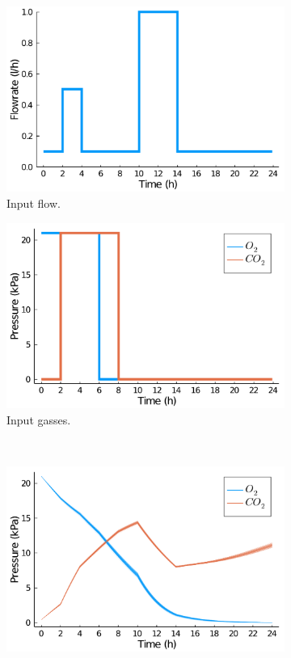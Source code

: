 \begin{figure}[H]
	\centering
	\begin{subfigure}[b]{0.45\textwidth}
		\includegraphics[width=1.0\textwidth]{figure/paper 2/b12_input_flow.pdf}
		\caption{Input flow.}
		\label{figbayesiana}
	\end{subfigure}
	\begin{subfigure}[b]{0.45\textwidth}
		\centering
		\includegraphics[width=1.0\textwidth]{figure/paper 2/b12_input_gass.pdf}
		\caption{Input gasses.}
		\label{figbayesianb}
	\end{subfigure}
	\\
	\begin{subfigure}{0.45\textwidth}
		\centering
		\includegraphics[width=1.2\textwidth]{figure/paper 2/b12_output.pdf}

\end{subfigure}
\end{figure}
